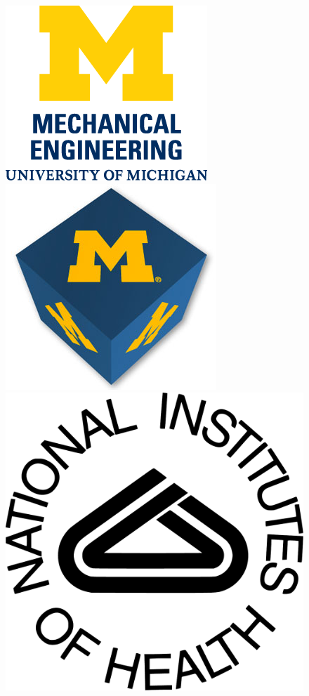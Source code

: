 \begin{frame}
  \vfill
  \begin{figure}
    \centering
    \includegraphics[height=0.25\textheight]{./include/figs/CoE-ME-vert} \hfill
    \includegraphics[height=0.25\textheight]{./include/figs/mcubed_logo} \hfill
    \includegraphics[height=0.25\textheight]{./include/figs/NIH_logo_white}\hfill

\end{figure}
\end{frame}
